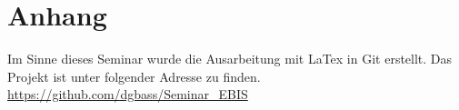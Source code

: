\chapter{Anhang}
Im Sinne dieses Seminar wurde die Ausarbeitung mit LaTex in Git erstellt.
Das Projekt ist unter folgender Adresse zu finden.
\\
\url{https://github.com/dgbass/Seminar_EBIS}


